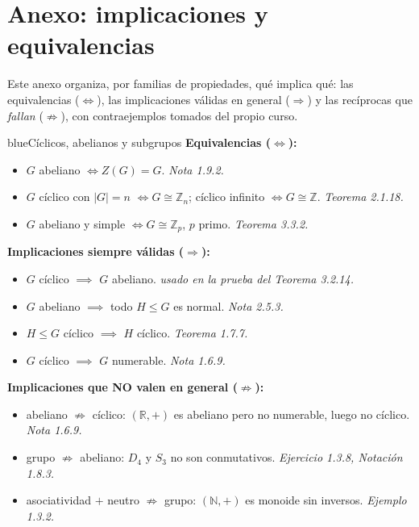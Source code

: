 \documentclass[11pt,twoside]{article}
\newcommand{\Z}{\mathbb{Z}}
\newcommand{\R}{\mathbb{R}}
\begin{document}
\section{Anexo: implicaciones y equivalencias}

Este anexo organiza, por familias de propiedades, qué implica qué: las equivalencias ($\Leftrightarrow$), las implicaciones válidas en general ($\Rightarrow$) y las recíprocas que \emph{fallan} ($\not\Rightarrow$), con contraejemplos tomados del propio curso.

\begin{equivbox}{blue}{Cíclicos, abelianos y subgrupos}
\textbf{Equivalencias ($\Leftrightarrow$):}
\begin{itemize}[leftmargin=1.8em]
\item $G$ abeliano $\iff Z(G) = G$. \hfill\textit{Nota 1.9.2.}
\item $G$ cíclico con $\lvert G \rvert = n$ $\iff G \cong \Z_{n}$; \quad cíclico infinito $\iff G \cong \Z$. \hfill\textit{Teorema 2.1.18.}
\item $G$ abeliano y simple $\iff G \cong \Z_{p}$, $p$ primo. \hfill\textit{Teorema 3.3.2.}
\end{itemize}
\textbf{Implicaciones siempre válidas ($\Rightarrow$):}
\begin{itemize}[leftmargin=1.8em]
\item $G$ cíclico $\implies$ $G$ abeliano. \hfill\textit{usado en la prueba del Teorema 3.2.14.}
\item $G$ abeliano $\implies$ todo $H \leq G$ es normal. \hfill\textit{Nota 2.5.3.}
\item $H \leq G$ cíclico $\implies$ $H$ cíclico. \hfill\textit{Teorema 1.7.7.}
\item $G$ cíclico $\implies$ $G$ numerable. \hfill\textit{Nota 1.6.9.}
\end{itemize}
\textbf{Implicaciones que NO valen en general ($\not\Rightarrow$):}
\begin{itemize}[leftmargin=1.8em]
\item abeliano $\not\Rightarrow$ cíclico: $(\R, +)$ es abeliano pero no numerable, luego no cíclico. \hfill\textit{Nota 1.6.9.}
\item grupo $\not\Rightarrow$ abeliano: $D_{4}$ y $S_{3}$ no son conmutativos. \hfill\textit{Ejercicio 1.3.8, Notación 1.8.3.}
\item asociatividad $+$ neutro $\not\Rightarrow$ grupo: $(\mathbb{N}, +)$ es monoide sin inversos. \hfill\textit{Ejemplo 1.3.2.}
\end{itemize}
\end{equivbox}
\end{document}
